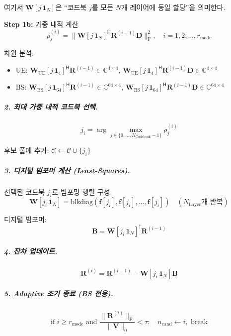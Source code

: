 \documentclass[10pt]{article}
\begin{document}
여기서 $\mathbf{W}[j\,\mathbf{1}_N]$은 ``코드북 $j$를 모든 $N$개 레이어에 동일 할당''을 의미한다.

\textbf{Step 1b:} 가중 내적 계산
\begin{equation}
\rho_j^{(i)} = \|\mathbf{W}[j\,\mathbf{1}_N]^{\mathsf{H}} \mathbf{R}^{(i-1)} \mathbf{D}\|_{\text{F}}^2, \quad i = 1,2,\ldots, r_{\text{mode}}
\end{equation}

차원 분석:
\begin{itemize}
    \item UE: $\mathbf{W}_{\text{UE}}[j\,\mathbf{1}_4]^{\mathsf{H}} \mathbf{R}^{(i-1)} \in \mathbb{C}^{4 \times 4}$, $\mathbf{W}_{\text{UE}}[j\,\mathbf{1}_4]^{\mathsf{H}} \mathbf{R}^{(i-1)} \mathbf{D} \in \mathbb{C}^{4 \times 4}$
    \item BS: $\mathbf{W}_{\text{BS}}[j\,\mathbf{1}_{64}]^{\mathsf{H}} \mathbf{R}^{(i-1)} \in \mathbb{C}^{64 \times 4}$, $\mathbf{W}_{\text{BS}}[j\,\mathbf{1}_{64}]^{\mathsf{H}} \mathbf{R}^{(i-1)} \mathbf{D} \in \mathbb{C}^{64 \times 4}$
\end{itemize}

\subparagraph{2. 최대 가중 내적 코드북 선택.}
\begin{equation}
j_i = \arg\max_{j \in \{0, \ldots, N_{\text{Codebook}}-1\}} \rho_j^{(i)}
\end{equation}

후보 풀에 추가: $\mathcal{C} \gets \mathcal{C} \cup \{j_i\}$

\subparagraph{3. 디지털 빔포머 계산 (Least-Squares).}
선택된 코드북 $j_i$로 빔포밍 행렬 구성:
\begin{equation}
\mathbf{W}[j_i\,\mathbf{1}_N] = \text{blkdiag}(\mathbf{f}[j_i], \mathbf{f}[j_i], \ldots, \mathbf{f}[j_i]) \quad (N_{\text{Layer}}\text{개 반복})
\end{equation}

디지털 빔포머:
\begin{equation}
\mathbf{B} = \mathbf{W}[j_i\,\mathbf{1}_N]^{\dagger} \mathbf{R}^{(i-1)}
\end{equation}

\subparagraph{4. 잔차 업데이트.}
\begin{equation}
\mathbf{R}^{(i)} = \mathbf{R}^{(i-1)} - \mathbf{W}[j_i\,\mathbf{1}_N] \mathbf{B}
\end{equation}

\subparagraph{5. Adaptive 조기 종료 (BS 전용).}
\begin{equation}
\text{if } i \geq r_{\text{mode}} \text{ and } \frac{\|\mathbf{R}^{(i)}\|_{\text{F}}}{\|\mathbf{V}\|_0} < \tau: \quad n_{\text{cand}} \gets i, \text{ break}
\end{equation}
\end{document}
